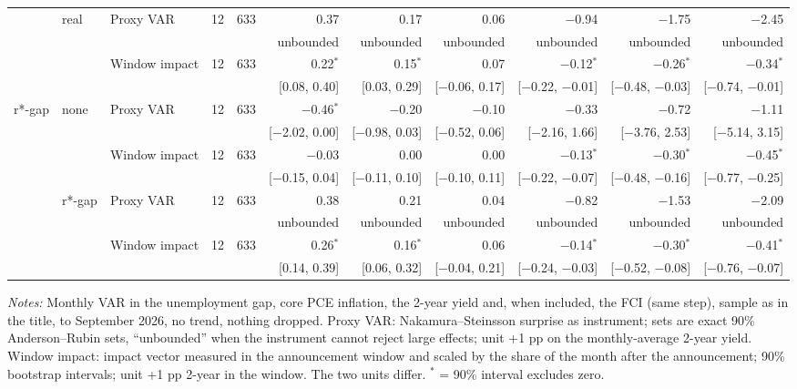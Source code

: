 \begin{table}[tp]
{\begin{tabular}{lllcrrrrrrr}
 & real & Proxy VAR & 12 & 633 & 0.37 & 0.17 & 0.06 & $-$0.94 & $-$1.75 & $-$2.45\\
 & & & & & {\tiny unbounded} & {\tiny unbounded} & {\tiny unbounded} & {\tiny unbounded} & {\tiny unbounded} & {\tiny unbounded}\\
 &  & Window impact & 12 & 633 & 0.22$^{*}$ & 0.15$^{*}$ & 0.07 & $-$0.12$^{*}$ & $-$0.26$^{*}$ & $-$0.34$^{*}$\\
 & & & & & {\tiny [0.08, 0.40]} & {\tiny [0.03, 0.29]} & {\tiny [$-$0.06, 0.17]} & {\tiny [$-$0.22, $-$0.01]} & {\tiny [$-$0.48, $-$0.03]} & {\tiny [$-$0.74, $-$0.01]}\\
\addlinespace
r*-gap & none & Proxy VAR & 12 & 633 & $-$0.46$^{*}$ & $-$0.20 & $-$0.10 & $-$0.33 & $-$0.72 & $-$1.11\\
 & & & & & {\tiny [$-$2.02, 0.00]} & {\tiny [$-$0.98, 0.03]} & {\tiny [$-$0.52, 0.06]} & {\tiny [$-$2.16, 1.66]} & {\tiny [$-$3.76, 2.53]} & {\tiny [$-$5.14, 3.15]}\\
 &  & Window impact & 12 & 633 & $-$0.03 & 0.00 & 0.00 & $-$0.13$^{*}$ & $-$0.30$^{*}$ & $-$0.45$^{*}$\\
 & & & & & {\tiny [$-$0.15, 0.04]} & {\tiny [$-$0.11, 0.10]} & {\tiny [$-$0.10, 0.11]} & {\tiny [$-$0.22, $-$0.07]} & {\tiny [$-$0.48, $-$0.16]} & {\tiny [$-$0.77, $-$0.25]}\\
 & r*-gap & Proxy VAR & 12 & 633 & 0.38 & 0.21 & 0.04 & $-$0.82 & $-$1.53 & $-$2.09\\
 & & & & & {\tiny unbounded} & {\tiny unbounded} & {\tiny unbounded} & {\tiny unbounded} & {\tiny unbounded} & {\tiny unbounded}\\
 &  & Window impact & 12 & 633 & 0.26$^{*}$ & 0.16$^{*}$ & 0.06 & $-$0.14$^{*}$ & $-$0.30$^{*}$ & $-$0.41$^{*}$\\
 & & & & & {\tiny [0.14, 0.39]} & {\tiny [0.06, 0.32]} & {\tiny [$-$0.04, 0.21]} & {\tiny [$-$0.24, $-$0.03]} & {\tiny [$-$0.52, $-$0.08]} & {\tiny [$-$0.76, $-$0.07]}\\
\bottomrule\end{tabular}}
\begin{flushleft}\footnotesize\textit{Notes:} Monthly VAR in the unemployment gap, core PCE inflation, the 2-year yield and, when included, the FCI (same step), sample as in the title, to September 2026, no trend, nothing dropped. Proxy VAR: Nakamura--Steinsson surprise as instrument; sets are exact 90\% Anderson--Rubin sets, ``unbounded'' when the instrument cannot reject large effects; unit +1 pp on the monthly-average 2-year yield. Window impact: impact vector measured in the announcement window and scaled by the share of the month after the announcement; 90\% bootstrap intervals; unit +1 pp 2-year in the window. The two units differ. $^{*}$ = 90\% interval excludes zero.\end{flushleft}
\end{table}
